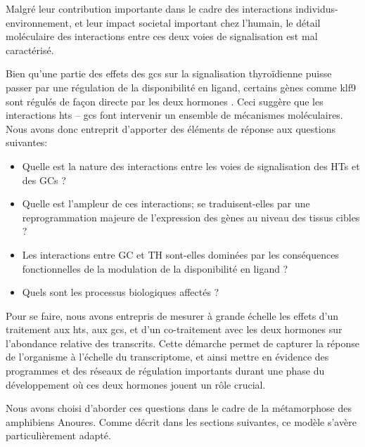 \documentclass[../main.tex]{subfiles}
\begin{document}
\par
Malgré leur contribution importante dans le cadre des interactions individus-environnement, et leur impact societal important chez l'humain, le détail moléculaire des interactions entre ces deux voies de signalisation est mal caractérisé.
\par
Bien qu'une partie des effets des \glspl{gc} sur la signalisation thyroïdienne puisse passer par une régulation de la disponibilité en ligand, certains gènes comme \gls{klf9} sont régulés de façon directe par les deux hormones \citep{Denver2009b,Bagamasbad2012}.
Ceci suggère que les interactions \glspl{ht} – \glspl{gc} font intervenir un ensemble de mécanismes moléculaires. 
Nous avons donc entreprit d'apporter des éléments de réponse aux questions suivantes:
\begin{itemize}
\item Quelle est la nature des interactions entre les voies de signalisation des HTs et des GCs ? 
\item Quelle est l'ampleur de ces interactions; se traduisent-elles par une reprogrammation majeure de l'expression des gènes au niveau des tissus cibles ?
\item Les interactions entre GC et TH sont-elles dominées par les conséquences fonctionnelles de la modulation de la disponibilité en ligand ?
\item Quels sont les processus biologiques affectés ?
\end{itemize}
Pour se faire, nous avons entrepris de mesurer à grande échelle les effets d'un traitement aux \glspl{ht}, aux \glspl{gc}, et d'un co-traitement avec les deux hormones sur l'abondance relative des transcrits.
Cette démarche permet de capturer la réponse de l'organisme à l'échelle du transcriptome, et ainsi mettre en évidence des programmes et des réseaux de régulation importants durant une phase du développement où ces deux hormones jouent un rôle crucial.
\par
Nous avons choisi d'aborder ces questions dans le cadre de la métamorphose des amphibiens Anoures.
Comme décrit dans les sections suivantes, ce modèle s'avère particulièrement adapté.



\end{document}
